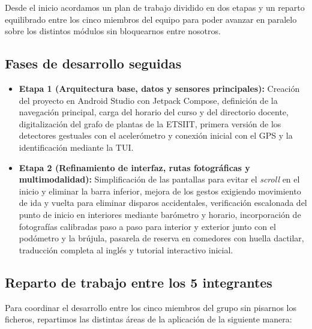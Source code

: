\documentclass[11pt,a4paper]{article}
\begin{document}
Desde el inicio acordamos un plan de trabajo dividido en dos etapas y un reparto equilibrado entre los cinco miembros del equipo para poder avanzar en paralelo sobre los distintos módulos sin bloquearnos entre nosotros.

\vspace{-0.25cm}
\subsection{Fases de desarrollo seguidas}
\begin{itemize}[leftmargin=1.8em]
    \item \textbf{Etapa 1 (Arquitectura base, datos y sensores principales):} Creación del proyecto en Android Studio con Jetpack Compose, definición de la navegación principal, carga del horario del curso y del directorio docente, digitalización del grafo de plantas de la ETSIIT, primera versión de los detectores gestuales con el acelerómetro y conexión inicial con el GPS y la identificación mediante la TUI.
    \item \textbf{Etapa 2 (Refinamiento de interfaz, rutas fotográficas y multimodalidad):} Simplificación de las pantallas para evitar el \textit{scroll} en el inicio y eliminar la barra inferior, mejora de los gestos exigiendo movimiento de ida y vuelta para eliminar disparos accidentales, verificación escalonada del punto de inicio en interiores mediante barómetro y horario, incorporación de fotografías calibradas paso a paso para interior y exterior junto con el podómetro y la brújula, pasarela de reserva en comedores con huella dactilar, traducción completa al inglés y tutorial interactivo inicial.
\end{itemize}

\subsection{Reparto de trabajo entre los 5 integrantes}
Para coordinar el desarrollo entre los cinco miembros del grupo sin pisarnos los ficheros, repartimos las distintas áreas de la aplicación de la siguiente manera:
\end{document}
